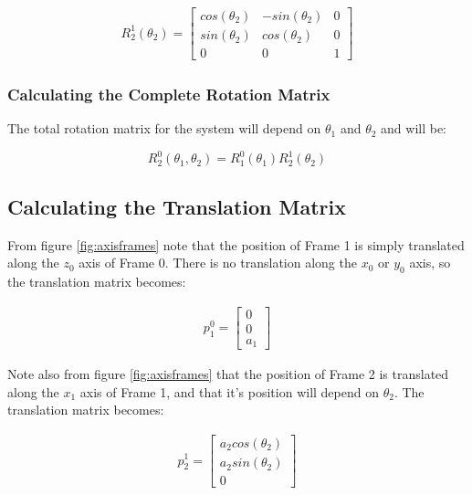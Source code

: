\documentclass[a4paper, titlepage]{article}
\begin{document}
\begin{equation}
\begin{split}
R^1_{2}(\theta_{2}) = 
\begin{bmatrix}
cos(\theta_{2}) & -sin(\theta_{2}) & 0 \\ 
sin(\theta_{2}) & cos(\theta_{2}) & 0 \\ 
0 & 0 & 1
\end{bmatrix}
\end{split}
\label{equ:r12}
\end{equation}

\subsubsection{Calculating the Complete Rotation Matrix}

The total rotation matrix for the system will depend on $\theta_{1}$ and $\theta_{2}$ and will be:

\begin{equation}
R^0_{2}(\theta_{1},\theta_{2}) = R^0_{1}(\theta_{1})R^1_{2}(\theta_{2})
\label{equ:rotationmatrix}
\end{equation}


\subsection{Calculating the Translation Matrix}

From figure \ref{fig:axisframes} note that the position of Frame 1 is simply translated along the $z_{0}$ axis of Frame 0.  There is no translation along the $x_{0}$ or $y_{0}$ axis, so the translation matrix becomes:

\begin{equation}
\begin{split}
p^0_{1} = 
\begin{bmatrix}
0 \\ 
0 \\ 
a_{1}
\end{bmatrix}
\end{split}
\label{equ:p01}
\end{equation}

Note also from figure \ref{fig:axisframes} that the position of Frame 2 is  translated along the $x_{1}$ axis of Frame 1, and that it's position will depend on $\theta_{2}$.  The translation matrix becomes:

\begin{equation}
\begin{split}
p^1_{2} = 
\begin{bmatrix}
a_{2}cos(\theta_{2}) \\ 
a_{2}sin(\theta_{2}) \\ 
0
\end{bmatrix}
\end{split}
\label{equ:p12}
\end{equation}
\end{document}
